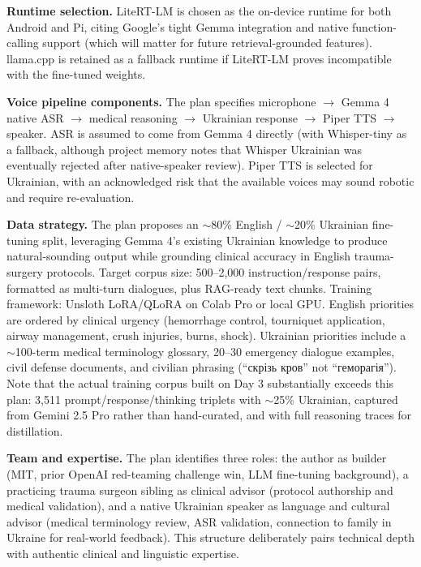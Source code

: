 \documentclass{article}
\theoremstyle{plain}
\theoremstyle{definition}
\theoremstyle{remark}
\begin{document}
\textbf{Runtime selection.} LiteRT-LM is chosen as the on-device runtime for both Android and Pi, citing Google's tight Gemma integration and native function-calling support (which will matter for future retrieval-grounded features). llama.cpp is retained as a fallback runtime if LiteRT-LM proves incompatible with the fine-tuned weights.

\textbf{Voice pipeline components.} The plan specifies microphone $\rightarrow$ Gemma 4 native ASR $\rightarrow$ medical reasoning $\rightarrow$ Ukrainian response $\rightarrow$ Piper TTS $\rightarrow$ speaker. ASR is assumed to come from Gemma 4 directly (with Whisper-tiny as a fallback, although project memory notes that Whisper Ukrainian was eventually rejected after native-speaker review). Piper TTS is selected for Ukrainian, with an acknowledged risk that the available voices may sound robotic and require re-evaluation.

\textbf{Data strategy.} The plan proposes an $\sim$80\% English / $\sim$20\% Ukrainian fine-tuning split, leveraging Gemma 4's existing Ukrainian knowledge to produce natural-sounding output while grounding clinical accuracy in English trauma-surgery protocols. Target corpus size: 500--2{,}000 instruction/response pairs, formatted as multi-turn dialogues, plus RAG-ready text chunks. Training framework: Unsloth LoRA/QLoRA on Colab Pro or local GPU. English priorities are ordered by clinical urgency (hemorrhage control, tourniquet application, airway management, crush injuries, burns, shock). Ukrainian priorities include a $\sim$100-term medical terminology glossary, 20--30 emergency dialogue examples, civil defense documents, and civilian phrasing (``скрізь кров'' not ``геморагія''). Note that the actual training corpus built on Day 3 substantially exceeds this plan: 3{,}511 prompt/response/thinking triplets with $\sim$25\% Ukrainian, captured from Gemini 2.5 Pro rather than hand-curated, and with full reasoning traces for distillation.

\textbf{Team and expertise.} The plan identifies three roles: the author as builder (MIT, prior OpenAI red-teaming challenge win, LLM fine-tuning background), a practicing trauma surgeon sibling as clinical advisor (protocol authorship and medical validation), and a native Ukrainian speaker as language and cultural advisor (medical terminology review, ASR validation, connection to family in Ukraine for real-world feedback). This structure deliberately pairs technical depth with authentic clinical and linguistic expertise.
\end{document}
